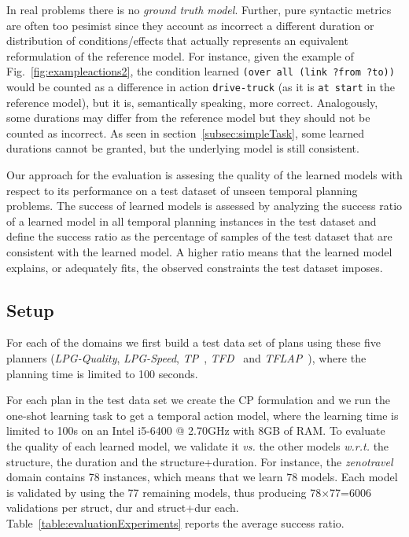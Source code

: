 \documentclass[runningheads]{llncs}
\begin{document}
In real problems there is no {\em ground truth model}. Further, pure syntactic metrics are often too pesimist since they account as incorrect a different duration or distribution of conditions/effects that actually represents an equivalent reformulation of the reference model. For instance, given the example of Fig.~\ref{fig:exampleactions2}, the condition learned \texttt{(over all (link ?from ?to))} would be counted as a difference in action \texttt{drive-truck} (as it is \texttt{at start} in the reference model), but it is, semantically speaking, more correct. Analogously, some durations may differ from the reference model but they should not be counted as incorrect. As seen in section~\ref{subsec:simpleTask}, some learned durations cannot be granted, but the underlying model is still consistent. 

Our approach for the evaluation is assesing the quality of the learned models with respect to its performance on a test dataset of unseen temporal planning problems. The success of learned models is assessed by analyzing the success ratio of a learned model in all temporal planning instances in the test dataset and define the success ratio as the percentage of samples of the test dataset that are consistent with the learned model. A higher ratio means that the learned model explains, or adequately fits, the observed constraints the test dataset imposes.

\subsection{Setup}
For each of the domains we first build a test data set of plans using these five planners (\textit{LPG-Quality}, \textit{LPG-Speed}\cite{gerevini2003planning}, \textit{TP}~\cite{jimenez2015temporal}, \textit{TFD}~\cite{eyerich2009using} and \textit{TFLAP}~\cite{marzal2016temporal}), where the planning time is limited to 100 seconds.

For each plan in the test data set we create the CP formulation and we run the one-shot learning task to get a temporal action model, where the learning time is limited to 100s on an Intel i5-6400 @ 2.70GHz with 8GB of RAM. To evaluate the quality of each learned model, we validate it \emph{vs.} the other models \emph{w.r.t.} the structure, the duration and the structure+duration. For instance, the \emph{zenotravel} domain contains 78 instances, which means that we learn 78 models. Each model is validated by using the 77 remaining models, thus producing 78$\times$77=6006 validations per struct, dur and struct+dur each. Table~\ref{table:evaluationExperiments} reports the average success ratio.
\end{document}
